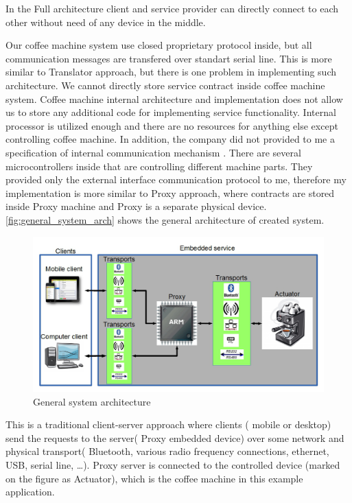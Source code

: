 In the Full architecture client and service provider can directly connect to
each other without need of any device in the middle. 

Our coffee machine system use closed proprietary protocol inside, but all
communication messages are transfered over standart serial line. This is more
similar to Translator approach, but there is one problem in implementing such
architecture. We cannot directly store service contract inside coffee machine
system. Coffee machine internal architecture and implementation does not allow
us to store any additional code for implementing service functionality. Internal
processor is utilized enough and there are no resources for anything else except
controlling coffee machine. In addition, the company did not
provided to me a specification of internal communication mechanism . There
are several microcontrollers inside that are controlling different machine
parts.
They provided  only the external interface communication protocol to me,
therefore my implementation is more similar to Proxy approach, where contracts are stored inside Proxy machine
and Proxy is a separate physical device.
\autoref{fig:general_system_arch} shows the general architecture of created
system.

\begin{center}
 \begin{figure}[h]
	\includegraphics[width=\textwidth]{../images/implementation/system_arch.png}
	\caption{General system architecture }
	\label{fig:general_system_arch}
 \end{figure}
\end{center}

This is a traditional client-server approach where clients ( mobile or desktop)
send the requests to the server( Proxy embedded device) over some network and
physical transport( Bluetooth, various radio frequency connections, ethernet,
USB, serial line, \ldots). Proxy server is connected to the controlled device 
(marked on the figure as Actuator), which is the coffee machine in this example
application.

